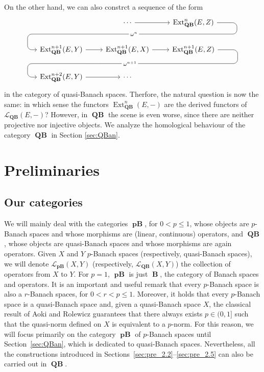 \documentclass[12pt,a4paper]{amsproc}
\theoremstyle{remark}
\theoremstyle{definition}
\newcommand{\Ext}{\operatorname{Ext}}
\newcommand{\QBan}{\operatorname{\textbf{QB}}}
\newcommand{\pBan}{\operatorname{\textbf{pB}}}
\newcommand{\Ban}{\operatorname{\textbf{B}}}
\numberwithin{equation}{section}
\begin{document}
    \par On the other hand, we can also constrct a sequence of the form
    \begin{equation}
		\begin{tikzcd}
			& \cdots \arrow[r] 			\arrow[dl, phantom, ""{coordinate, name=Z}]                    & {\Ext_{\QBan}^n(E,Z)} \arrow[dll,
			"\omega^n" description, rounded corners=6pt,
			to path={ -- ([xshift=6.5ex]\tikztostart.east)
				|- (Z) [very near end] \tikztonodes
				-| ([xshift=-3ex]\tikztotarget.west)
				-- (\tikztotarget)}]        \\
			{\Ext_{\QBan}^{n+1}(E,Y)} \arrow[r] & {\Ext_{\QBan}^{n+1}(E,X)} \arrow[r] \arrow[dl, phantom, ""{coordinate, name=ZZ}] & {\Ext_{\QBan}^{n+1}(E,Z)} \arrow[dll,
			"\omega^{n+1}" description, rounded corners=6pt,
			to path={ -- ([xshift=6.5ex]\tikztostart.east)
				|- (ZZ) [very near end] \tikztonodes
				-| ([xshift=-3ex]\tikztotarget.west)
				-- (\tikztotarget)}]  \\
			{\Ext_{\QBan}^{n+2}(E,Y)} \arrow[r] & \cdots                              &
		\end{tikzcd}
	\end{equation}
in the category of quasi-Banach spaces. Therfore, the natural question is now the same: in which sense the functors $\Ext^n_{\QBan}(E,-)$ are the derived functors of $\mathcal{L}_{\QBan}(E,-)$? However, in $\QBan$ the scene is even worse, since there are neither projective nor injective objects. We analyze the homological behaviour of the category $\QBan$ in Section \ref{sec:QBan}. 

	\section{Preliminaries}
    \subsection{Our categories} We will mainly deal with the categories $\boldsymbol{\pBan}$, for $0 <p \leq 1$, whose objects are $p$-Banach spaces and whose morphisms are (linear, continuous) operators, and $\boldsymbol{\QBan}$, whose objects are quasi-Banach spaces and whose morphisms are again operators. Given $X$ and $Y$ $p$-Banach spaces (respectively, quasi-Banach spaces), we will denote $\mathcal{L}_{\boldsymbol{\pBan}}(X,Y)$ (respectively,  $\mathcal{L}_{\boldsymbol{\QBan}}(X,Y)$) the collection of operators from $X$ to $Y$. For $p=1$, $\boldsymbol{\pBan}$ is just $\boldsymbol{\Ban}$, the category of Banach spaces and operators. It is an important and useful remark that every $p$-Banach space is also a $r$-Banach spaces, for $0<r<p \leq 1$. Moreover, it holds that every $p$-Banach space is a quasi-Banach space and, given a quasi-Banach space $X$, the classical result of Aoki and Rolewicz \cite[Theorem 1.2]{fspace} guarantees that there always exists $p\in (0,1]$ such that the quasi-norm defined on $X$ is equivalent to a $p$-norm. For this reason, we will focus primarily on the category $\boldsymbol{\pBan}$ of $p$-Banach spaces until Section~\ref{sec:QBan}, which is dedicated to quasi-Banach spaces. Nevertheless, all the constructions introduced in Sections~\ref{sec:pre_2.2}--\ref{sec:pre_2.5} can also be carried out in $\boldsymbol{\QBan}$.
\end{document}
